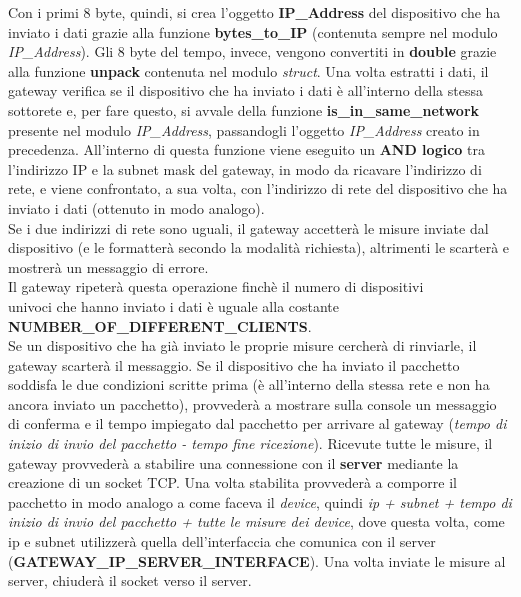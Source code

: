 \documentclass[a4paper, 14pt]{extreport}
\begin{document}
    Con i primi 8 byte, quindi, si crea l'oggetto \textbf{IP\_Address} del dispositivo che ha inviato i dati
    grazie alla funzione \textbf{bytes\_to\_IP} (contenuta sempre nel modulo \emph{IP\_Address}).
    Gli 8 byte del tempo, invece, vengono convertiti in \textbf{double} grazie alla funzione \textbf{unpack}
    contenuta nel modulo \emph{struct}.
    Una volta estratti i dati, il gateway verifica se il dispositivo che ha inviato i dati è
    all'interno della stessa sottorete e, per fare questo, si avvale della funzione
    \textbf{is\_in\_same\_network} presente nel modulo \emph{IP\_Address}, passandogli l'oggetto
    \emph{IP\_Address} creato in precedenza.
    All'interno di questa funzione viene eseguito un \textbf{AND logico} tra l'indirizzo IP e la subnet mask
    del gateway, in modo da ricavare l'indirizzo di rete, e viene confrontato, a sua volta, con l'indirizzo di rete
    del dispositivo che ha inviato i dati (ottenuto in modo analogo). \\
    Se i due indirizzi di rete sono uguali, il
    gateway accetterà le misure inviate dal dispositivo (e le formatterà secondo la modalità richiesta), altrimenti le scarterà e mostrerà un messaggio di errore. \\
    Il gateway ripeterà questa operazione finchè il numero di dispositivi \\ 
    univoci che hanno inviato i dati è uguale alla costante  \\
    \textbf{NUMBER\_OF\_DIFFERENT\_CLIENTS}.   \\
    Se un dispositivo che ha già inviato le proprie misure cercherà di rinviarle, il gateway scarterà il messaggio.
    Se il dispositivo che ha inviato il pacchetto soddisfa le due condizioni scritte prima
    (è all'interno della stessa rete e non ha ancora inviato un pacchetto), provvederà a 
    mostrare sulla console un messaggio di conferma e il tempo impiegato dal pacchetto per 
    arrivare al gateway (\emph{tempo di inizio di invio del pacchetto - tempo fine ricezione}).
    Ricevute tutte le misure, il gateway provvederà a stabilire una connessione con il \textbf{server} mediante la
    creazione di un socket TCP.
    Una volta stabilita provvederà a comporre il pacchetto in modo analogo a come faceva il \emph{device},
    quindi \emph{ip + subnet + tempo di inizio di invio del pacchetto + tutte le misure dei device}, 
    dove questa volta, come ip e subnet utilizzerà quella dell'interfaccia che comunica con il server
    (\textbf{GATEWAY\_IP\_SERVER\_INTERFACE}).
    Una volta inviate le misure al server, chiuderà il socket verso il server.
\end{document}
